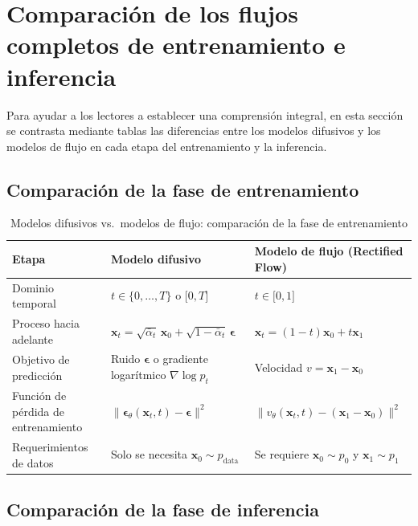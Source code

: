 \documentclass[a4paper]{article}
\begin{document}
\section{Comparación de los flujos completos de entrenamiento e inferencia}

Para ayudar a los lectores a establecer una comprensión integral, en esta sección se contrasta mediante tablas las diferencias entre los modelos difusivos y los modelos de flujo en cada etapa del entrenamiento y la inferencia.

\subsection{Comparación de la fase de entrenamiento}

\begin{table}[H]
\centering
\caption{Modelos difusivos vs.\ modelos de flujo: comparación de la fase de entrenamiento}
\begin{tabular}{@{} p{3.8cm} p{5cm} p{5cm} @{}}
\toprule
\textbf{Etapa} & \textbf{Modelo difusivo} & \textbf{Modelo de flujo (Rectified Flow)} \\
\midrule
Dominio temporal & $t \in \{0, \ldots, T\}$ o ${[}0, T{]}$ & $t \in {[}0, 1{]}$ \\
Proceso hacia adelante & $\mathbf{x}_t = \sqrt{\bar\alpha_t}\,\mathbf{x}_0 + \sqrt{1-\bar\alpha_t}\,\boldsymbol{\epsilon}$ & $\mathbf{x}_t = (1-t)\mathbf{x}_0 + t\mathbf{x}_1$ \\
Objetivo de predicción & Ruido $\boldsymbol{\epsilon}$ o gradiente logarítmico $\nabla\log p_t$ & Velocidad $v = \mathbf{x}_1 - \mathbf{x}_0$ \\
Función de pérdida de entrenamiento & $\|\boldsymbol{\epsilon}_\theta(\mathbf{x}_t,t) - \boldsymbol{\epsilon}\|^2$ & $\|v_\theta(\mathbf{x}_t,t) - (\mathbf{x}_1-\mathbf{x}_0)\|^2$ \\
Requerimientos de datos & Solo se necesita $\mathbf{x}_0 \sim p_{\text{data}}$ & Se requiere $\mathbf{x}_0 \sim p_0$ y $\mathbf{x}_1 \sim p_1$ \\
\bottomrule
\end{tabular}
\end{table}

\subsection{Comparación de la fase de inferencia}
\end{document}
